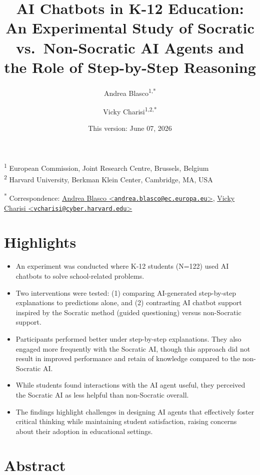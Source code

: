 \documentclass[
  11pt,
]{article}
\title{AI Chatbots in K-12 Education: An Experimental Study of Socratic vs.~Non-Socratic AI Agents and the Role of Step-by-Step Reasoning}
\author{Andrea Blasco\textsuperscript{1,*} \and Vicky Charisi\textsuperscript{1,2,*}}
\date{This version: June 07, 2026}
\begin{document}
\maketitle

\textsuperscript{1} European Commission, Joint Research Centre, Brussels, Belgium\\
\textsuperscript{2} Harvard University, Berkman Klein Center, Cambridge, MA, USA

\textsuperscript{*} Correspondence: \href{mailto:andrea.blasco@ec.europa.eu}{Andrea Blasco \textless{}\href{mailto:andrea.blasco@ec.europa.eu}{\nolinkurl{andrea.blasco@ec.europa.eu}}\textgreater{}}, \href{mailto:vcharisi@cyber.harvard.edu}{Vicky Charisi \textless{}\href{mailto:vcharisi@cyber.harvard.edu}{\nolinkurl{vcharisi@cyber.harvard.edu}}\textgreater{}}

\section*{Highlights}\label{highlights}

\begin{itemize}
\item
  An experiment was conducted where K-12 students (N=122) used AI chatbots to solve school-related problems.
\item
  Two interventions were tested: (1) comparing AI-generated step-by-step explanations to predictions alone, and (2) contrasting AI chatbot support inspired by the Socratic method (guided questioning) versus non-Socratic support.
\item
  Participants performed better under step-by-step explanations. They also engaged more frequently with the Socratic AI, though this approach did not result in improved performance and retain of knowledge compared to the non-Socratic AI.
\item
  While students found interactions with the AI agent useful, they perceived the Socratic AI as less helpful than non-Socratic overall.
\item
  The findings highlight challenges in designing AI agents that effectively foster critical thinking while maintaining student satisfaction, raising concerns about their adoption in educational settings.
\end{itemize}

\section*{Abstract}\label{abstract}
\end{document}
